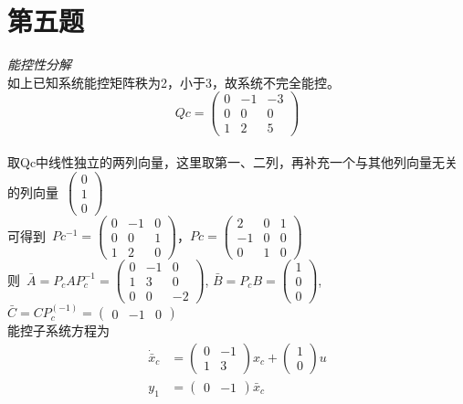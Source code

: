 \documentclass[a4paper]{article}
\begin{document}
\section*{第五题}
\emph{能控性分解}\\
如上已知系统能控矩阵秩为2，小于3，故系统不完全能控。\\
$$Qc= \left(\begin{array}{ccc} 0 & -1 & -3\\ 0 & 0 & 0\\ 1 & 2 & 5 \end{array}\right) $$ \\
\mbox{取Qc中线性独立的两列向量，这里取第一、二列，再补充一个与其他列向量无关的列向量 }$\left(\begin{array}{c} 0\\ 1\\ 0 \end{array}\right)$ \\
\mbox{可得到 }$Pc^{-1}=\left(\begin{array}{ccc} 0 & -1 & 0\\ 0 & 0 & 1\\ 1 & 2 & 0 \end{array}\right)$，$Pc=\left(\begin{array}{ccc} 2 & 0 & 1\\ -1 & 0 & 0\\ 0 & 1 & 0 \end{array}\right)$ \\
\mbox{则 }$ \bar{A} =P_{c}AP_{c}^{-1}= \left(\begin{array}{ccc} 0 & -1 & 0\\ 1 & 3 & 0\\ 0 & 0 & -2 \end{array}\right)$,
$ \bar{B} =P_{c}B=\left(\begin{array}{c} 1\\ 0\\ 0 \end{array}\right)$,
$ \bar{C} =CP_{c}^(-1)=\left(\begin{array}{ccc} 0 & -1 & 0 \end{array}\right)$
\noindent \\
能控子系统方程为
\begin{align*}
\dot{\bar{x}}_{c} &=  \left(\begin{array}{cc} 0 & -1\\ 1 & 3 \end{array}\right)x_{c}+\left(\begin{array}{c} 1\\ 0 \end{array}\right)u \\ 
y_{1} &= \left(\begin{array}{cc} 0 & -1 \end{array}\right)\bar{x}_{c}
\end{align*}
\end{document}
